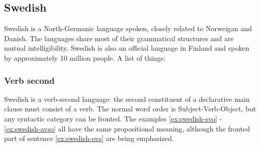 \documentclass{report}
\begin{document}
\subsection{Swedish}
Swedish is a North-Germanic language spoken,
closely related to Norweigan and Danish. The languages share most of their
grammatical structures and are mutual intelligibility. Swedish is also 
an official language in Finland and spoken by approximately 10 million people.
A list of things:
\subsubsection*{Verb second}
Swedish is a verb-second language: the
second constituent of a declarative main clause must consist of a verb.
The normal word order is Subject-Verb-Object, but any syntactic category can be fronted.
The examples \ref{ex:swedish-svo} - \ref{ex:swedish-avso} all have the same propositional
meaning, although the fronted part of sentence \ref{ex:swedish-ovs} are being emphasized.
 \label{ex:swedish-svo}
\label{ex:swedish-ovs} 
 \label{ex:swedish-avso}

\end{document}
